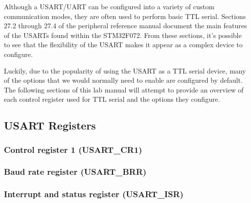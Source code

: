 \documentclass[11pt,fleqn]{book} %
\begin{document}
Although a USART/UART can be configured into a variety of custom communication modes, they are often used to perform basic TTL serial. Sections 27.2 through 27.4 of the peripheral reference manual document the main features of the USARTs found within the STM32F072. From these sections, it's possible to see that the flexibility of the USART makes it appear as a complex device to configure. 

Luckily, due to the popularity of using the USART as a TTL serial device, many of the options that we would normally need to enable are configured by default. The following sections of this lab manual will attempt to provide an overview of each control register used for TTL serial and the options they configure. 

\subsection{USART Registers}	

\subsubsection{Control register 1 (USART\_CR1)}

\subsubsection{Baud rate register (USART\_BRR)}

\subsubsection{Interrupt and status register (USART\_ISR)}

\subsubsection{}

\subsubsection{}

\subsubsection{}


\end{document}
